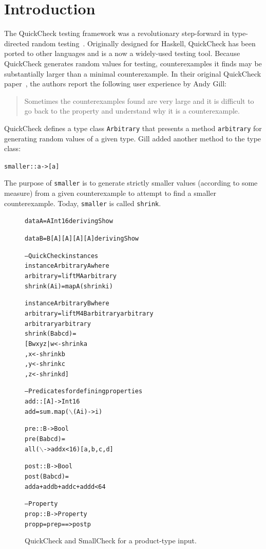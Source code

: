\documentclass[10pt]{sigplanconf}
\newenvironment{code}{\begin{alltt}}{\end{alltt}}
\newcommand{\ttp}[1]{\texttt{#1}}
\begin{document}
\section{Introduction}\label{sec:intro}
The QuickCheck testing framework was a revolutionary step-forward in
type-directed random testing~\cite{qc}.  Originally designed for Haskell,
QuickCheck has been ported to other languages and is a now a widely-used testing
tool.  Because QuickCheck generates random values for testing, counterexamples
it finds may be substantially larger than a minimal counterexample.  In their
original QuickCheck paper~\cite{qc}, the authors report the following user
experience by Andy Gill:
%
\begin{quote}
Sometimes the counterexamples found are very large and it is difficult to go
back to the property and understand why it is a counterexample.
\end{quote}
%
\noindent
QuickCheck defines a type class \ttp{Arbitrary} that presents a method
\ttp{arbitrary} for generating random values of a given type.  Gill added another
method to the type class:
%
\begin{code}
smaller :: a -> [a]
\end{code}
%
\noindent
The purpose of \ttp{smaller} is to generate strictly smaller values (according to
some measure) from a given counterexample to attempt to find a smaller
counterexample.  Today, \ttp{smaller} is called \ttp{shrink}.

\begin{figure}[ht]
\begin{code}
data A = A Int16 deriving Show

data B = B [A] [A] [A] [A] deriving Show

-- QuickCheck instances
instance Arbitrary A where
  arbitrary    = liftM A arbitrary
  shrink (A i) = map A (shrink i)

instance Arbitrary B where
  arbitrary = liftM4 B arbitrary arbitrary
                       arbitrary arbitrary
  shrink (B a b c d) =
    [ B w x y z | w <- shrink a
                , x <- shrink b
                , y <- shrink c
                , z <- shrink d ]

-- Predicates for defining properties
add :: [A] -> Int16
add = sum . map (\(\backslash\)(A i) -> i)

pre :: B -> Bool
pre (B a b c d) =
  all (\(\backslash\) -> add x < 16) [a, b, c, d]

post :: B -> Bool
post (B a b c d) =
  add a + add b + add c + add d < 64

-- Property
prop :: B -> Property
prop p = pre p ==> post p
\end{code}
  \caption{QuickCheck and SmallCheck for a product-type input.}
  \label{fig:initial}
\end{figure}
\end{document}

